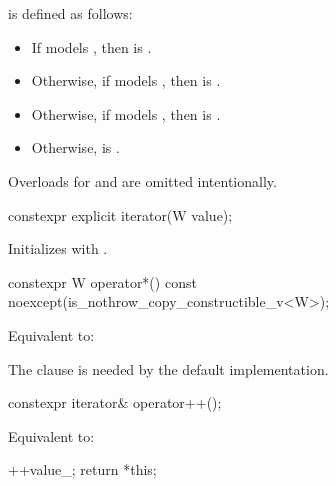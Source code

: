 \pnum
{} is defined as follows:
\begin{itemize}
\item If  models , then
 is .
\item Otherwise, if  models , then
 is .
\item Otherwise, if  models , then
 is .
\item Otherwise,  is .
\end{itemize}

\pnum
\begin{note}
Overloads for  and  are omitted intentionally.
\end{note}

\begin{itemdecl}
constexpr explicit iterator(W value);
\end{itemdecl}

\begin{itemdescr}
\pnum
\effects Initializes  with .
\end{itemdescr}

\begin{itemdecl}
constexpr W operator*() const noexcept(is_nothrow_copy_constructible_v<W>);
\end{itemdecl}

\begin{itemdescr}
\pnum
\effects Equivalent to: 

\pnum
\begin{note}
The  clause is needed by the default 
implementation.
\end{note}
\end{itemdescr}

\begin{itemdecl}
constexpr iterator& operator++();
\end{itemdecl}

\begin{itemdescr}
\pnum
\effects Equivalent to:
\begin{codeblock}
++value_;
return *this;
\end{codeblock}
\end{itemdescr}

